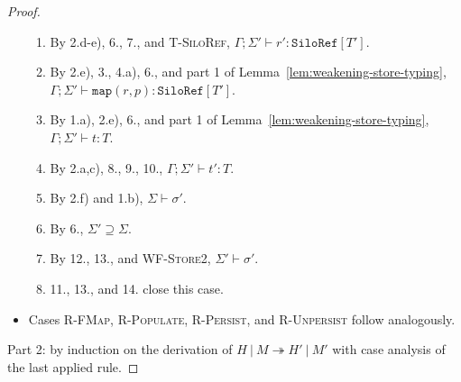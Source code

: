 \begin{proof}
\begin{itemize}
\begin{enumerate}
\item By 2.d-e), 6., 7., and \textsc{T-SiloRef}, $\Gamma ; \Sigma' \vdash r' : \texttt{SiloRef}[T']$.
\item By 2.e), 3., 4.a), 6., and part 1 of Lemma~\ref{lem:weakening-store-typing}, $\Gamma ; \Sigma' \vdash \texttt{map}(r, p) : \texttt{SiloRef}[T']$.
\item By 1.a), 2.e), 6., and part 1 of Lemma~\ref{lem:weakening-store-typing}, $\Gamma ; \Sigma' \vdash t : T$.
\item By 2.a,c), 8., 9., 10., $\Gamma ; \Sigma' \vdash t' : T$.
\item By 2.f) and 1.b), $\Sigma \vdash \sigma'$.
\item By 6., $\Sigma' \supseteq \Sigma$.
\item By 12., 13., and \textsc{WF-Store2}, $\Sigma' \vdash \sigma'$.
\item 11., 13., and 14. close this case.
\end{enumerate}

\item Cases \textsc{R-FMap}, \textsc{R-Populate}, \textsc{R-Persist}, and \textsc{R-Unpersist} follow analogously.
\end{itemize}

%
Part 2: by induction on the derivation of $H~|~M \twoheadrightarrow H'~|~M'$ with case analysis of the last applied rule.


\end{proof}
